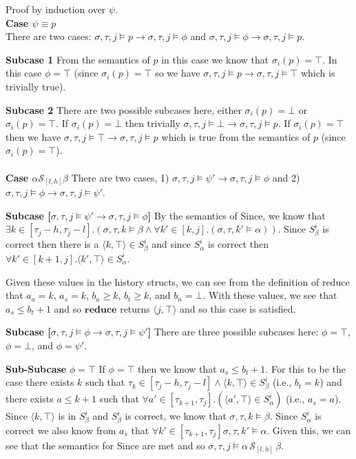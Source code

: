 \documentclass[10pt,a4paper]{article}
\newcommand{\rp}[2]{\ensuremath{\langle #1, #2 \rangle}}
\begin{document}
\noindent Proof by induction over $\psi$. \\

\noindent \textbf{Case $\psi \equiv p$} \\
There are two cases: $\sigma, \tau, j \vDash p \rightarrow \sigma, \tau, j \vDash \phi$ and $\sigma,\tau,j\vDash \phi \rightarrow \sigma,\tau,j\vDash p$.

\textbf{Subcase 1}
From the semantics of $p$ in this case we know that $\sigma_i(p) = \top$. In this case $\phi = \top$ (since $\sigma_i(p) = \top$ so we have $\sigma,\tau,j\vDash p \rightarrow \sigma,\tau,j\vDash \top$ which is trivially true).

\textbf{Subcase 2}
There are two possible subcases here, either $\sigma_i(p) = \bot$ or $\sigma_i(p) = \top$. If $\sigma_i(p) = \bot$ then trivially $\sigma,\tau,j\vDash \bot \rightarrow \sigma,\tau,j\vDash p$. If $\sigma_i(p) = \top$ then we have $\sigma,\tau,j\vDash \top \rightarrow \sigma,\tau,j\vDash p$ which is true from the semantics of $p$ (since $\sigma_i(p) = \top$).
\\ \\
\noindent \textbf{Case $\alpha \mathcal{S}_{[l,h]} \beta$}
There are two cases, 1) $\sigma, \tau, j \vDash \psi' \rightarrow \sigma, \tau, j \vDash \phi$ and 2) $\sigma, \tau, j \vDash \phi \rightarrow \sigma, \tau, j \vDash \psi'$.

\textbf{Subcase [$\sigma, \tau, j \vDash \psi' \rightarrow \sigma, \tau, j \vDash \phi$]} 
By the semantics of Since, we know that $\exists k \in [\tau_j-h,\tau_j-l].(\sigma, \tau, k \vDash \beta \wedge \forall k' \in [k,j].(\sigma, \tau, k' \vDash \alpha))$. Since $S^i_{\beta}$ is correct then there is a $\rp{k}{\top} \in S^i_{\beta}$ and since $S^i_\alpha$ is correct then $\forall k' \in [k+1,j]. \rp{k'}{\top} \in S^i_\alpha$.

Given these values in the history structs, we can see from the definition of reduce that $a_a = k$, $a_s = k$, $b_a \geq k$, $b_t \geq k$, and $b_n = \bot$. With these values, we see that $a_s \leq b_t + 1$ and so $\mathbf{reduce}$ returns $\rp{j}{\top}$ and so this case is satisfied.

\textbf{Subcase [$\sigma, \tau, j \vDash \phi \rightarrow \sigma, \tau, j \vDash \psi'$]}
There are three possible subcases here: $\phi = \top$, $\phi = \bot$, and $\phi = \psi'$.

\hspace{2em} \textbf{Sub-Subcase} $\phi = \top$
If $\phi = \top$ then we know that $a_s \leq b_t + 1$. For this to be the case there exists $k$ such that $\tau_k \in [\tau_j-h,\tau_j-l] \wedge \rp{k}{\top} \in S^i_\beta$ (i.e., $b_t = k$) and there exists $a \leq k+1$ such that $\forall a' \in [\tau_{k+1},\tau_j].(\rp{a'}{\top} \in S^i_\alpha)$ (i.e., $a_s = a$). Since $\rp{k}{\top}$ is in $S^i_\beta$ and $S^i_\beta$ is correct, we know that $\sigma,\tau,k \vDash \beta$. Since $S^i_\alpha$ is correct we also know from $a_s$ that $\forall k' \in [\tau_{k+1},\tau_j] \sigma, \tau, k' \vDash \alpha$. Given this, we can see that the semantics for Since are met and so $\sigma, \tau, j \vDash \alpha\, \mathcal{S}_{[l,h]}\, \beta$.
\end{document}
